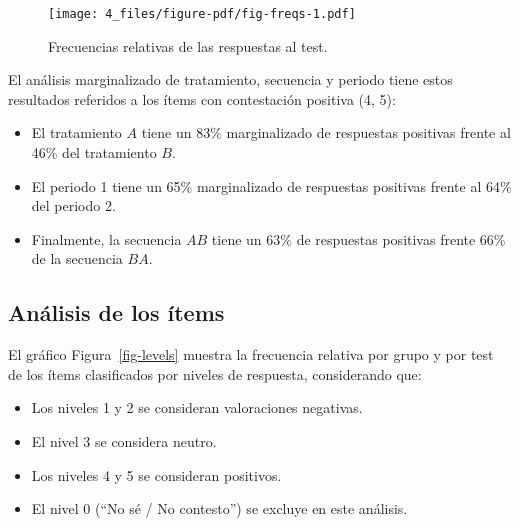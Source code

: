 \documentclass[
  12pt,
  a4paper,
  extrafontsizes,
  onecolumn,
  openright,
  table]{memoir}
\providecommand{\tightlist}{%
  \setlength{\itemsep}{0pt}\setlength{\parskip}{0pt}}\usepackage{longtable,booktabs,array}
\begin{document}
\begin{figure}[h]

{\centering \texttt{[image: 4\_files/figure-pdf/fig-freqs-1.pdf]}

}

\caption{\label{fig-freqs}Frecuencias relativas de las respuestas al
test.}

\end{figure}

El análisis marginalizado de tratamiento, secuencia y periodo tiene
estos resultados referidos a los ítems con contestación positiva (4, 5):

\begin{itemize}
\item
  El tratamiento \(A\) tiene un 83\% marginalizado de respuestas
  positivas frente al 46\% del tratamiento \(B\).
\item
  El periodo 1 tiene un 65\% marginalizado de respuestas positivas
  frente al 64\% del periodo 2.
\item
  Finalmente, la secuencia \(AB\) tiene un 63\% de respuestas positivas
  frente 66\% de la secuencia \(BA\).
\end{itemize}

\hypertarget{anuxe1lisis-de-los-uxedtems}{%
\subsection{Análisis de los ítems}\label{anuxe1lisis-de-los-uxedtems}}

El gráfico Figura~\ref{fig-levels} muestra la frecuencia relativa por
grupo y por test de los ítems clasificados por niveles de respuesta,
considerando que:

\begin{itemize}
\tightlist
\item
  Los niveles 1 y 2 se consideran valoraciones negativas.
\item
  El nivel 3 se considera neutro.
\item
  Los niveles 4 y 5 se consideran positivos.
\item
  El nivel 0 (\enquote{No sé / No contesto}) se excluye en este
  análisis.
\end{itemize}
\end{document}

